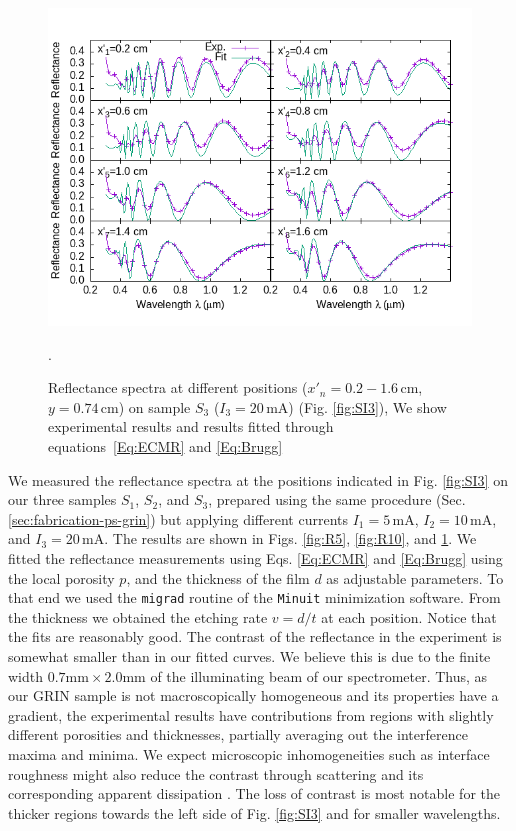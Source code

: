 \documentclass[review,sort&compress]{cas-sc}
\begin{document}
\begin{figure}
  \centering
  \includegraphics[width=\textwidth]{fig10}
  \caption{Reflectance spectra at different positions
    ($x'_n=0.2-1.6\,\text{cm}$, $y=0.74\,\text{cm}$)
    on sample $S_3$ ($I_3=20\,\text{mA}$) (Fig. \ref{fig:SI3}),
    We show
    experimental results and results fitted through
    equations~\eqref{Eq:ECMR} and \eqref{Eq:Brugg}}.
  \label{fig:R20}
\end{figure}

We measured the reflectance spectra  at the positions indicated in
Fig. \ref{fig:SI3} on our three samples $S_1$, $S_2$,
and $S_3$, prepared using the same procedure
(Sec. \ref{sec:fabrication-ps-grin}) but applying different currents
$I_1=5\,\text{mA}$, $I_2=10\,\text{mA}$, and $I_3=20\,\text{mA}$. The results are shown in
Figs. \ref{fig:R5}, \ref{fig:R10}, and \ref{fig:R20}.
We fitted the reflectance measurements using Eqs. \eqref{Eq:ECMR} and
\eqref{Eq:Brugg} using the local porosity $p$, and the thickness of the
film  $d$ as
adjustable parameters. To that end we used the {\tt migrad} routine of
the {\tt Minuit} minimization software. From the thickness we
obtained the etching rate $v=d/t$ at each position. Notice that the fits are reasonably
good. The contrast of the reflectance in the experiment is somewhat smaller
than in our fitted curves. We believe this is due to the finite width
$0.7\text{mm}\times2.0\text{mm}$ of the illuminating beam of our
spectrometer. Thus, as our GRIN sample is not macroscopically homogeneous and its
properties have a gradient, the
experimental results have contributions from regions with slightly
different porosities and thicknesses, partially averaging out the interference
maxima and minima. We expect microscopic inhomogeneities such as
interface roughness might also reduce the contrast through scattering
and its corresponding apparent dissipation \cite{missoni2020rough}.
The loss of contrast is most notable for the thicker regions
towards the left side of Fig. \ref{fig:SI3} and for smaller
wavelengths.
\end{document}

